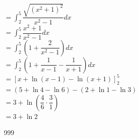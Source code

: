 \documentclass[a4paper]{article}
\begin{document}
$=\displaystyle\int_2^5 \dfrac{\sqrt{(x^2+1)^2}}{x^2-1} dx$\\

$=\displaystyle\int_2^5 \dfrac{x^2+1}{x^2-1} dx$\\

$=\displaystyle\int_2^5 \left(1+\dfrac{2}{x^2-1}\right) dx$\\

$=\displaystyle\int_2^5 \left(1+\dfrac{1}{x-1}-\dfrac{1}{x+1}\right) dx$\\

$=\left[x+\ln(x-1)-\ln(x+1)\right]_2^5$\\

$=\left(5+\ln 4-\ln 6\right)-\left(2+\ln 1-\ln 3\right)$\\

$=3+\ln\left(\dfrac{4}{6}\cdot\dfrac{3}{1}\right)$\\

$=3+\ln 2$\\

\begin{thebibliography}{999}
\end{thebibliography}
\end{document}

